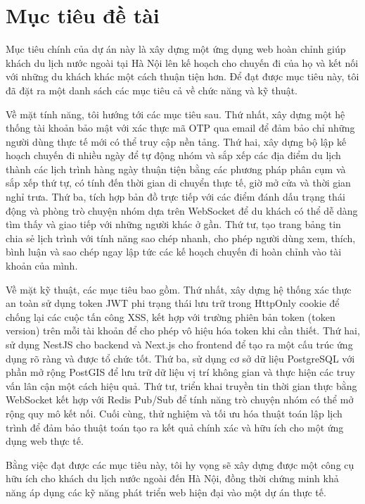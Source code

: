 \documentclass[a4paper,12pt]{report}
\begin{document}
\section{Mục tiêu đề tài}

Mục tiêu chính của dự án này là xây dựng một ứng dụng web hoàn chỉnh giúp khách du lịch nước ngoài tại Hà Nội lên kế hoạch cho chuyến đi của họ và kết nối với những du khách khác một cách thuận tiện hơn. Để đạt được mục tiêu này, tôi đã đặt ra một danh sách các mục tiêu cả về chức năng và kỹ thuật.

Về mặt tính năng, tôi hướng tới các mục tiêu sau. Thứ nhất, xây dựng một hệ thống tài khoản bảo mật với xác thực mã OTP qua email để đảm bảo chỉ những người dùng thực tế mới có thể truy cập nền tảng. Thứ hai, xây dựng bộ lập kế hoạch chuyến đi nhiều ngày để tự động nhóm và sắp xếp các địa điểm du lịch thành các lịch trình hàng ngày thuận tiện bằng các phương pháp phân cụm và sắp xếp thứ tự, có tính đến thời gian di chuyển thực tế, giờ mở cửa và thời gian nghỉ trưa. Thứ ba, tích hợp bản đồ trực tiếp với các điểm đánh dấu trạng thái động và phòng trò chuyện nhóm dựa trên WebSocket để du khách có thể dễ dàng tìm thấy và giao tiếp với những người khác ở gần. Thứ tư, tạo trang bảng tin chia sẻ lịch trình với tính năng sao chép nhanh, cho phép người dùng xem, thích, bình luận và sao chép ngay lập tức các kế hoạch chuyến đi hoàn chỉnh vào tài khoản của mình.

Về mặt kỹ thuật, các mục tiêu bao gồm. Thứ nhất, xây dựng hệ thống xác thực an toàn sử dụng token JWT phi trạng thái lưu trữ trong HttpOnly cookie để chống lại các cuộc tấn công XSS, kết hợp với trường phiên bản token (token version) trên mỗi tài khoản để cho phép vô hiệu hóa token khi cần thiết. Thứ hai, sử dụng NestJS cho backend và Next.js cho frontend để tạo ra một cấu trúc ứng dụng rõ ràng và được tổ chức tốt. Thứ ba, sử dụng cơ sở dữ liệu PostgreSQL với phần mở rộng PostGIS để lưu trữ dữ liệu vị trí không gian và thực hiện các truy vấn lân cận một cách hiệu quả. Thứ tư, triển khai truyền tin thời gian thực bằng WebSocket kết hợp với Redis Pub/Sub để tính năng trò chuyện nhóm có thể mở rộng quy mô kết nối. Cuối cùng, thử nghiệm và tối ưu hóa thuật toán lập lịch trình để đảm bảo thuật toán tạo ra kết quả chính xác và hữu ích cho một ứng dụng web thực tế.

Bằng việc đạt được các mục tiêu này, tôi hy vọng sẽ xây dựng được một công cụ hữu ích cho khách du lịch nước ngoài đến Hà Nội, đồng thời chứng minh khả năng áp dụng các kỹ năng phát triển web hiện đại vào một dự án thực tế.
\end{document}
